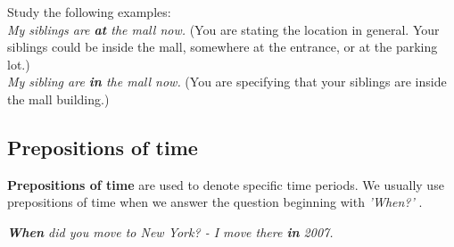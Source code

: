 \documentclass[hidelinks,10pt,a4paper]{article}
\begin{document}
Study the following examples:\\

\textit{My siblings are \textbf{at} the mall now.} (You are stating the location in general. Your siblings could be inside the mall, somewhere at the entrance, or at the parking lot.)\\

\textit{My sibling are \textbf{in} the mall now.} (You are specifying that your siblings are inside the mall building.)

\subsection{Prepositions of time}
\textbf{Prepositions of time} are used to denote specific time periods. We usually use prepositions of time when we answer the question beginning with \textit{'When?'} .

\begin{center}
	\textit{\textbf{When} did you move to New York? - I move there \textbf{in} 2007. }
\end{center}
\end{document}
